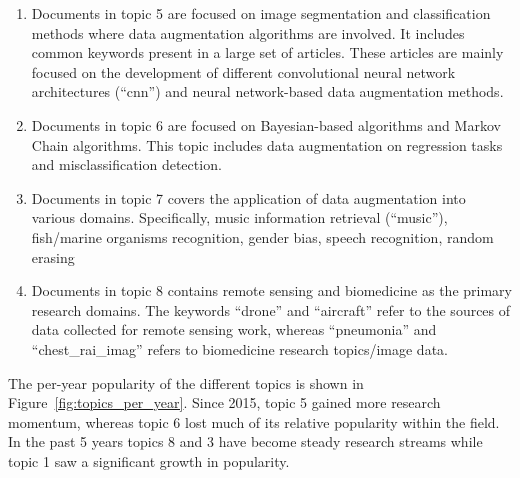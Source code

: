 \documentclass[parskip=full]{scrartcl}
\begin{document}
\begin{enumerate}
    \item Documents in topic 5 are focused on image segmentation
        and classification methods where data augmentation algorithms are
        involved. It includes common keywords present in a large set of
        articles. These articles are mainly focused on the development of
        different convolutional neural network architectures (``cnn'') and
        neural network-based data augmentation methods.

    \item Documents in topic 6 are focused on Bayesian-based algorithms and
        Markov Chain algorithms. This topic includes data augmentation on
        regression tasks and misclassification detection.

    \item Documents in topic 7 covers the application of data augmentation
        into various domains. Specifically, music information retrieval
        (``music''), fish/marine organisms recognition, gender bias, speech
        recognition, random erasing 

    \item Documents in topic 8 contains remote sensing and biomedicine as the
        primary research domains. The keywords ``drone'' and ``aircraft''
        refer to the sources of data collected for remote sensing work,
        whereas ``pneumonia'' and ``chest\_rai\_imag'' refers to biomedicine
        research topics/image data.
\end{enumerate}

\begin{table}[H]
    \centering
    \vspace{.2cm}
    \caption{\label{tab:topic_analysis}
        Description of the main topics found in the literature.
    }
\end{table}

The per-year popularity of the different topics is shown in
Figure~\ref{fig:topics_per_year}. Since 2015, topic 5 gained more research
momentum, whereas topic 6 lost much of its relative popularity within the
field. In the past 5 years topics 8 and 3 have become steady research streams
while topic 1 saw a significant growth in popularity. 
\end{document}
